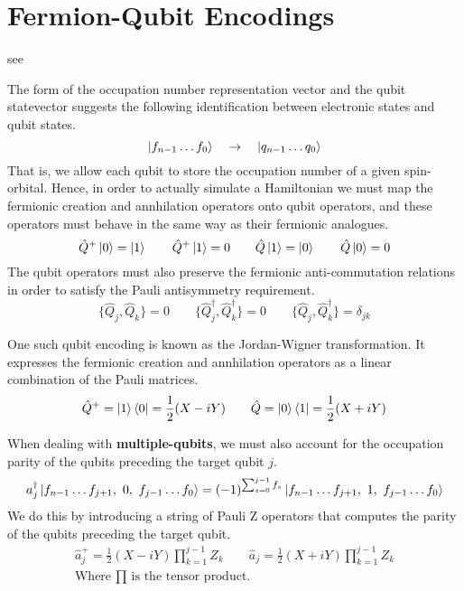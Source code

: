 \section{Fermion-Qubit Encodings}
see \cite{Seeley2020}

The form of the occupation number representation vector and the qubit statevector suggests the following identification between electronic states and qubit states.
\begin{equation*}
    \ket{f_{n-1} \dots f_{0}} \quad\rightarrow\quad \ket{q_{n-1} \dots q_{0}}
\end{equation*}
That is, we allow each qubit to store the occupation number of a given spin-orbital. Hence, in order to actually simulate a Hamiltonian we must map the fermionic creation and annhilation operators onto qubit operators, and these operators must behave in the same way as their fermionic analogues.
\begin{equation*}
    \hat Q^+ \ket 0 = \ket 1 \qquad
    \hat Q^+ \ket 1 = 0 \qquad
    \hat Q \ket 1 = \ket 0 \qquad
    \hat Q \ket 0 = 0
\end{equation*}
The qubit operators must also preserve the fermionic anti-commutation relations in order to satisfy the Pauli antisymmetry requirement.
\begin{equation*}
    \{ \hat Q_{j}, \hat Q_{k} \} = 0 \qquad
    \{ \hat Q_{j}^{\dagger}, \hat Q_{k}^{\dagger} \} = 0 \qquad
    \{ \hat Q_{j}, \hat Q_{k}^{\dagger} \} = \delta_{jk}
\end{equation*}

One such qubit encoding is known as the Jordan-Wigner transformation. It expresses the fermionic creation and annhilation operators as a linear combination of the Pauli matrices.
\begin{equation*}
    \hat Q^+ = \ket 1 \bra 0 = \frac{1}{2} (X - iY) \qquad \hat Q = \ket 0 \bra 1 = \frac{1}{2} (X + iY) 
\end{equation*}

When dealing with \textbf{multiple-qubits}, we must also account for the occupation parity of the qubits preceding the target qubit $j$.
\begin{equation*}
    a_j^\dagger \ket{f_{n-1} \dots f_{j+1},\,\, 0,\,\, f_{j-1} \dots f_0} = (-1)^{\sum_{s=0}^{j-1} f_s} \ket{f_{n-1} \dots f_{j+1},\,\, 1,\,\, f_{j-1} \dots f_0}
\end{equation*}
We do this by introducing a string of Pauli Z operators that computes the parity of the qubits preceding the target qubit.
\begin{equation*}
\begin{gathered}
    \hat a_j^+ = \frac{1}{2} (X - iY) \prod_{k=1}^{j-1} Z_k \qquad
    \hat a_j = \frac{1}{2} (X + iY) \prod_{k=1}^{j-1} Z_k \\[2ex]
    \text{Where $\prod$ is the tensor product.}
\end{gathered}
\end{equation*}

